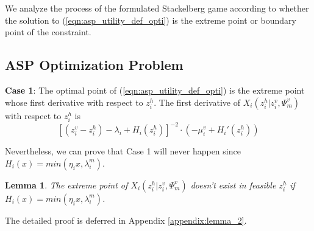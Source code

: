 \documentclass[10pt,journal, compsoc]{IEEEtran}
\newtheorem{lemma}{Lemma}
\begin{document}
We analyze the process of the formulated Stackelberg game according to whether the solution to (\ref{eqn:asp_utility_def_opti}) is the extreme point or boundary point of the constraint.

\subsection{ASP Optimization Problem}
\textbf{Case 1}: The optimal point of (\ref{eqn:asp_utility_def_opti}) is the extreme point whose first derivative with respect to $z_i^h$. The first derivative of $X_i(z_i^h|z_i^v,\Psi_m^v)$ with respect to $z_i^h$ is
\begin{equation} \label{eqn:asp_utilitu_def_firstderiv}
[(z_i^v - z_i^h) - \lambda_i + H_i(z_i^h)]^{-2} \cdot (-\mu_i^v + H_i'(z_i^h))
\end{equation}


Nevertheless, we can prove that Case 1 will never happen since $H_i(x) = min(\eta_i{x}, \lambda_i^m)$. %
\begin{lemma} \label{lemma:asp_case1_not_exist}
The extreme point of $X_i(z_i^h|z_i^v,\Psi_m^v)$ doesn't exist in feasible $z_i^h$ if $H_i(x) = min(\eta_i{x}, \lambda_i^m)$.
\end{lemma}
The detailed proof is deferred in Appendix \ref{appendix:lemma_2}.
\end{document}
